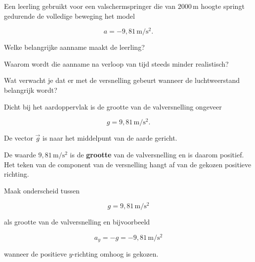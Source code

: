 \documentclass{ximera}
\begin{document}
\begin{oefening}{\oefU\ESS}

Een leerling gebruikt voor een valschermspringer die van
$2000\,\mathrm{m}$ hoogte springt gedurende de volledige beweging het
model

\[
a=-9,81\,\mathrm{m/s^2}.
\]

\begin{question}
Welke belangrijke aanname maakt de leerling?
\end{question}

\begin{question}
Waarom wordt die aanname na verloop van tijd steeds minder realistisch?
\end{question}

\begin{question}
Wat verwacht je dat er met de versnelling gebeurt wanneer de
luchtweerstand belangrijk wordt?
\end{question}

\end{oefening}




Dicht bij het aardoppervlak is de grootte van de valversnelling
ongeveer

\[
\boxed{
g=9,81\,\mathrm{m/s^2}.
}
\]

De vector $\vec g$ is naar het middelpunt van de aarde gericht.

De waarde $9,81\,\mathrm{m/s^2}$ is de \textbf{grootte} van de
valversnelling en is daarom positief. Het teken van de component van
de versnelling hangt af van de gekozen positieve richting.

\begin{opmerking}

Maak onderscheid tussen

\[
g=9,81\,\mathrm{m/s^2}
\]

als grootte van de valversnelling en bijvoorbeeld

\[
a_y=-g=-9,81\,\mathrm{m/s^2}
\]

wanneer de positieve $y$-richting omhoog is gekozen.

\end{opmerking}


\end{document}
